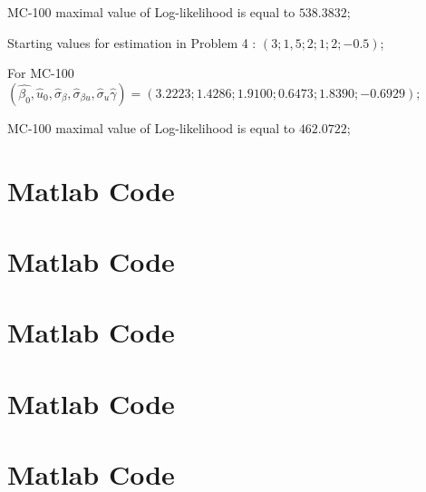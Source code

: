 \documentclass[a4paper,12pt]{article}
\begin{document}
MC-100 maximal value of Log-likelihood is equal to $538.3832$;

Starting values for estimation in Problem 4 : $(3;1,5;2;1;2;-0.5)$;
 
For MC-100 $(\hat{\beta_{0}},\hat{u}_{0},\hat{\sigma}_{\beta},\hat{\sigma}_{\beta u},\hat{\sigma}_{u}\hat{\gamma}) = (3.2223;1.4286;1.9100;0.6473;1.8390;-0.6929)$;

MC-100 maximal value of Log-likelihood is equal to $462.0722$;

\vspace{\baselineskip}




\newpage
\section*{Matlab Code} 

\newpage
\section*{Matlab Code} 

\newpage
\section*{Matlab Code} 

\newpage
\section*{Matlab Code} 

\newpage
\section*{Matlab Code} 
\end{document}
